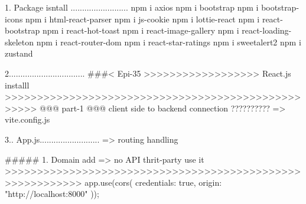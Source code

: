 1. Package isntall .........................
npm i axios
npm i bootstrap
npm i bootstrap-icons
npm i html-react-parser
npm i js-cookie
npm i lottie-react
npm i react-bootstrap
npm i react-hot-toast
npm i react-image-gallery
npm i react-loading-skeleton
npm i react-router-dom
npm i react-star-ratings
npm i sweetalert2
npm i zustand

2.................................
###< Epi-35 >>>>>>>>>>>>>>>>>> React.js installl >>>>>>>>>>>>>>>>>>>>>>>>>>>>>>>>>>>>>>>>>>>>>>>>>>>
     @@@ part-1 @@@ client side to backend connection ??????????
     => vite.config.js 

3.. App.js..........................
 => routing handling 


##### 1. Domain add => no API thrit-party use it >>>>>>>>>>>>>>>>>>>>>>>>>>>>>>>>>>>>>>>>>>>>>>>>>>>>>>>>>>
   app.use(cors({
   credentials: true, 
   origin: "http://localhost:8000" 
}));